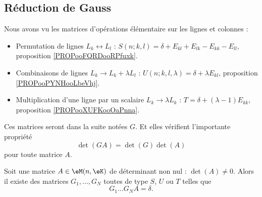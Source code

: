 \subsection{Réduction de Gauss}

Nous avons vu les matrices d'opérations élémentaire sur les lignes et colonnes :
\begin{itemize}
	\item Permutation de lignes \( L_k\leftrightarrow L_l\)  : \( S(n;k,l)=\delta+E_{kl}+E_{lk}-E_{kk}-E_{ll}\), proposition \ref{PROPooFQRDooRPfuxk}.
	\item Combinaisons de lignes \( L_k\to L_k+\lambda L_l\) : \( U(n;k,l,\lambda)=\delta+\lambda E_{kl}\), proposition \ref{PROPooPYNHooLbeVhj}.
	\item Multiplication d'une ligne par un scalaire \( L_k\to \lambda L_k\) : \( T=\delta+(\lambda-1)E_{kk}\), proposition \ref{PROPooXUFKooOaPnna}.
\end{itemize}

Ces matrices seront dans la suite notées \( G\). Et elles vérifient l'importante propriété
\begin{equation}        \label{EQooLQTVooBYjVYl}
	\det(GA)=\det(G)\det(A)
\end{equation}
pour toute matrice \( A\).

\begin{proposition}        \label{PROPooJBTZooNLobpf}
	Soit une matrice \( A\in \eM(n,\eK)\) de déterminant non nul : \( \det(A)\neq 0\). Alors il existe des matrices \( G_1,\ldots, G_N\) toutes de type \( S\), \( U\) ou \( T\) telles que
	\begin{equation}
		G_1\ldots G_NA=\delta.
	\end{equation}
\end{proposition}

